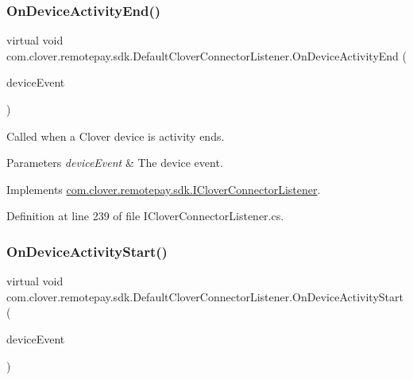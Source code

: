 \subsubsection{\texorpdfstring{On\+Device\+Activity\+End()}{OnDeviceActivityEnd()}}
{\footnotesize\ttfamily virtual void com.\+clover.\+remotepay.\+sdk.\+Default\+Clover\+Connector\+Listener.\+On\+Device\+Activity\+End (\begin{DoxyParamCaption}\item[{\hyperlink{classcom_1_1clover_1_1remotepay_1_1sdk_1_1_clover_device_event}{Clover\+Device\+Event}}]{device\+Event }\end{DoxyParamCaption})\hspace{0.3cm}{\ttfamily [virtual]}}



Called when a Clover device is activity ends. 


\begin{DoxyParams}{Parameters}
{\em device\+Event} & The device event.\\
\hline
\end{DoxyParams}


Implements \hyperlink{interfacecom_1_1clover_1_1remotepay_1_1sdk_1_1_i_clover_connector_listener_ad9b3f0be387c91e5f7de406b22478e39}{com.\+clover.\+remotepay.\+sdk.\+I\+Clover\+Connector\+Listener}.



Definition at line 239 of file I\+Clover\+Connector\+Listener.\+cs.

\mbox{\label{classcom_1_1clover_1_1remotepay_1_1sdk_1_1_default_clover_connector_listener_aec99f93d834adb5f8fb2ff1837391b5e}} 
\subsubsection{\texorpdfstring{On\+Device\+Activity\+Start()}{OnDeviceActivityStart()}}
{\footnotesize\ttfamily virtual void com.\+clover.\+remotepay.\+sdk.\+Default\+Clover\+Connector\+Listener.\+On\+Device\+Activity\+Start (\begin{DoxyParamCaption}\item[{\hyperlink{classcom_1_1clover_1_1remotepay_1_1sdk_1_1_clover_device_event}{Clover\+Device\+Event}}]{device\+Event }\end{DoxyParamCaption})\hspace{0.3cm}{\ttfamily [virtual]}}



